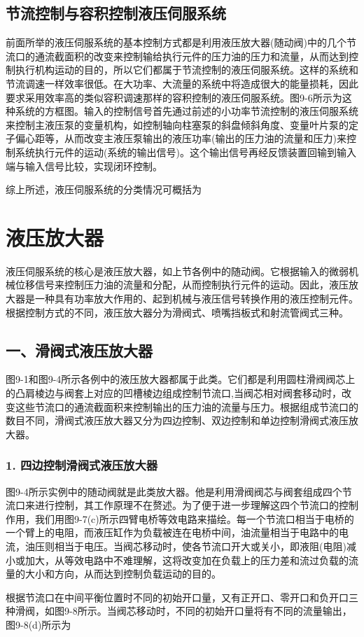 \subsection{节流控制与容积控制液压伺服系统}

    前面所举的液压伺服系统的基本控制方式都是利用液压放大器(随动阀)中的几个节流口的通流截面积的改变来控制输给执行元件的压力油的压力和流量，从而达到控制执行机构运动的目的，所以它们都属于节流控制的液压伺服系统。这样的系统和节流调速一样效率很低。在大功率、大流量的系统中将造成很大的能量损耗，因此要求采用效率高的类似容积调速那样的容积控制的液压伺服系统。图9-6所示为这种系统的方框图。输入的控制信号首先通过前述的小功率节流控制的液压伺服系统来控制主液压泵的变量机构，如控制轴向柱塞泵的斜盘倾斜角度、变量叶片泵的定子偏心距等，从而改变主液压泵输出的液压功率(输出的压力油的流量和压力)来控制系统执行元件的运动(系统的输出信号)。这个输出信号再经反馈装置回输到输入端与输入信号比较，实现闭环控制。

    综上所述，液压伺服系统的分类情况可概括为


\section{液压放大器}


    液压伺服系统的核心是液压放大器，如上节各例中的随动阀。它根据输入的微弱机械位移信号来控制压力油的流量和分配，从而控制执行元件的运动。因此，液压放大器是一种具有功率放大作用的、起到机械与液压信号转换作用的液压控制元件。根据控制方式的不同，液压放大器分为滑阀式、喷嘴挡板式和射流管阀式三种。

\subsection{一、滑阀式液压放大器}

	图9-1和图9-4所示各例中的液压放大器都属于此类。它们都是利用圆柱滑阀阀芯上的凸肩棱边与阀套上对应的凹槽棱边组成控制节流口,当阀芯相对阀套移动时，改变这些节流口的通流截面积来控制输出的压力油的流量与压力。根据组成节流口的数目不同，滑阀式液压放大器又分为四边控制、双边控制和单边控制滑阀式液压放大器。

\subsubsection{1. 四边控制滑阀式液压放大器}

	图9-4所示实例中的随动阀就是此类放大器。他是利用滑阀阀芯与阀套组成四个节流口来进行控制，其工作原理不在赘述。为了便于进一步理解这四个节流口的控制作用，我们用图9-7(c)所示四臂电桥等效电路来描绘。每一个节流口相当于电桥的一个臂上的电阻，而液压缸作为负载被连在电桥中间，油流量相当于电路中的电流，油压则相当于电压。当阀芯移动时，使各节流口开大或关小，即液阻(电阻)减小或加大，从等效电路中不难理解，这将改变加在负载上的压力差和流过负载的流量的大小和方向，从而达到控制负载运动的目的。

	根据节流口在中间平衡位置时不同的初始开口量，又有正开口、零开口和负开口三种滑阀，如图9-8所示。当阀芯移动时，不同的初始开口量将有不同的流量输出，图9-8(d)所示为

